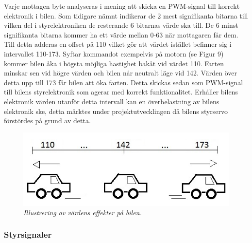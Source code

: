 \documentclass[a4paper]{article}
\begin{document}
\vspace{5mm} \noindent
Varje mottagen byte analyseras i mening att skicka en PWM-signal till korrekt elektronik i bilen. Som tidigare nämnt indikerar de 2 mest signifikanta bitarna till vilken del i styrelektroniken de resterande 6 bitarnas värde ska till. De 6 minst signifikanta bitarna kommer ha ett värde mellan 0-63 när mottagaren får dem. Till detta adderas en offset på 110 vilket gör att värdet istället befinner sig i intervallet 110-173. Syftar kommandot exempelvis på motorn (se Figur 9) kommer bilen åka i högsta möjliga hastighet bakåt vid värdet 110. Farten minskar sen vid högre värden och bilen når neutralt läge vid 142. Värden över detta upp till 173 får bilen att öka farten. Detta skickas sedan som PWM-signal till bilens styrelektronik som agerar med korrekt funktionalitet. Erhåller bilens elektronik värden utanför detta intervall kan en överbelastning av bilens elektronik ske, detta märktes under projektutvecklingen då bilens styrservo förstördes på grund av detta. 




\begin{figure}[H]
\includegraphics[scale=1]{110-173Car.jpg}
\centering
\caption{\it Illustrering av värdens effekter på bilen.}
\end{figure} 




\subsubsection{Styrsignaler}
\end{document}
